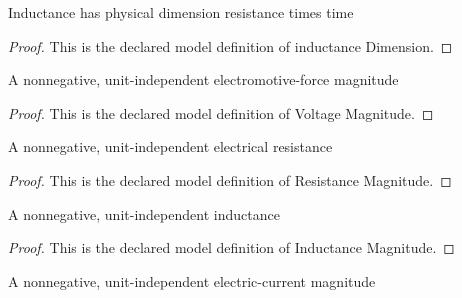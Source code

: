 \begin{definition}
  \label{def:physics:phyx-mini-0941:phyxminiproblems-problemphyxmini0941-inductancedimension}
  Inductance has physical dimension resistance times time
\end{definition}
\begin{proof}
  This is the declared model definition of inductance Dimension.
\end{proof}
\begin{definition}
  \label{def:physics:phyx-mini-0941:phyxminiproblems-problemphyxmini0941-voltagemagnitude}
  A nonnegative, unit-independent electromotive-force magnitude
\end{definition}
\begin{proof}
  This is the declared model definition of Voltage Magnitude.
\end{proof}
\begin{definition}
  \label{def:physics:phyx-mini-0941:phyxminiproblems-problemphyxmini0941-resistancemagnitude}
  A nonnegative, unit-independent electrical resistance
\end{definition}
\begin{proof}
  This is the declared model definition of Resistance Magnitude.
\end{proof}
\begin{definition}
  \label{def:physics:phyx-mini-0941:phyxminiproblems-problemphyxmini0941-inductancemagnitude}
  A nonnegative, unit-independent inductance
\end{definition}
\begin{proof}
  This is the declared model definition of Inductance Magnitude.
\end{proof}
\begin{definition}
  \label{def:physics:phyx-mini-0941:phyxminiproblems-problemphyxmini0941-currentmagnitude}
  A nonnegative, unit-independent electric-current magnitude
\end{definition}
